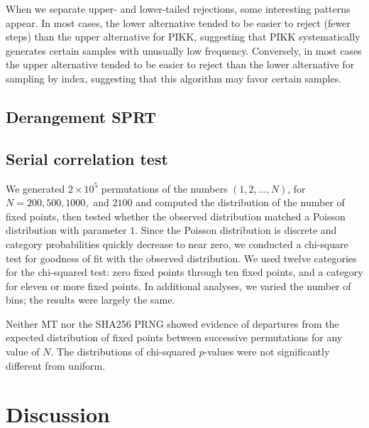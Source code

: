 \documentclass[12pt]{article}
\newcommand{\todo}[1]{{\color{red}{TO DO: \sc #1}}}
\begin{document}
When we separate upper- and lower-tailed rejections, some interesting patterns appear. 
In most cases, the lower alternative tended to be easier to reject (fewer steps) than the upper alternative for PIKK, suggesting that PIKK systematically generates certain samples with unusually low frequency. 
Conversely, in most cases the upper alternative tended to be easier to reject than the lower alternative for sampling by index, suggesting that this algorithm may favor certain samples.

\subsection{Derangement SPRT}
\todo{}

\subsection{Serial correlation test}
We generated $2 \times 10^5$ permutations of the numbers $(1, 2, \dots, N)$, for $N = 200, 500, 1000, $ and $2100$ 
and computed the distribution of the number of fixed points, then tested whether the observed distribution matched a Poisson distribution with parameter $1$.
Since the Poisson distribution is discrete and category probabilities quickly decrease to near zero, we conducted a chi-square test for goodness of fit with the observed distribution.
We used twelve categories for the chi-squared test: zero fixed points through ten fixed points, and a category for eleven or more fixed points.
In additional analyses, we varied the number of bins; the results were largely the same.

Neither MT nor the SHA256 PRNG showed evidence of departures from the expected distribution of fixed points between successive permutations for any value of $N$.
The distributions of chi-squared $p$-values were not significantly different from uniform.


\section{Discussion}\label{sec:discussion}



\todo{
Points to hit:
}
\end{document}

